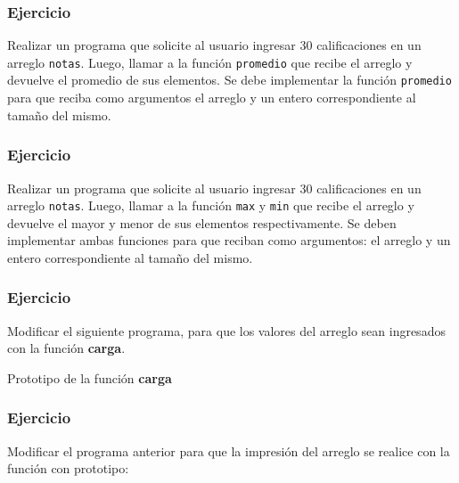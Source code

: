 \subsubsection{Ejercicio}
Realizar un programa que solicite al usuario ingresar 30 calificaciones en un arreglo \texttt{notas}. Luego, llamar a la función \texttt{promedio} que recibe el arreglo y devuelve el promedio de sus elementos. Se debe implementar la función \texttt{promedio} para que reciba como argumentos el arreglo y un entero correspondiente al tamaño del mismo.

\subsubsection{Ejercicio}
Realizar un programa que solicite al usuario ingresar 30 calificaciones en un arreglo \texttt{notas}. Luego, llamar a la función \texttt{max} y \texttt{min} que recibe el arreglo y devuelve el mayor y menor de sus elementos respectivamente. Se deben implementar ambas funciones para que reciban como argumentos: el arreglo y un entero correspondiente al tamaño del mismo.

\subsubsection{Ejercicio}
Modificar el siguiente programa, para que los valores del arreglo sean ingresados con la función \textbf{carga}.
\lstset{inputencoding=utf8/latin1}

Prototipo de la función \textbf{carga}
\lstset{inputencoding=utf8/latin1}


\subsubsection{Ejercicio}
Modificar el programa anterior para que la impresión del arreglo se realice con la función con prototipo:
\lstset{inputencoding=utf8/latin1}


